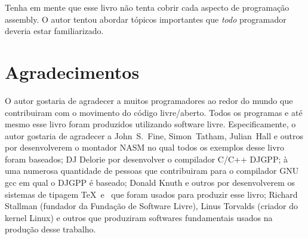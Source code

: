 Tenha em mente que esse livro n\~ao tenta cobrir cada aspecto de programa\c{c}\~ao
assembly. O autor tentou abordar t\'opicos importantes que \emph{todo} programador
deveria estar familiarizado.

\section*{Agradecimentos}

O autor gostaria de agradecer a muitos programadores ao redor do mundo
que contribuiram com o movimento do c\'odigo livre/aberto. Todos os programas
e at\'e mesmo esse livro foram produzidos utilizando software livre. Especificamente,
o autor gostaria de agradecer a John~S.~Fine, Simon~Tatham, Julian~Hall e outros por
desenvolverem o montador NASM no qual todos os exemplos desse livro foram baseados;
DJ Delorie por desenvolver o compilador C/C++ DJGPP; \`a uma numerosa quantidade de
pessoas que contribuiram para o compilador GNU gcc em qual o DJGPP \'e baseado; 
Donald Knuth e outros por desenvolverem os sistemas de tipagem \TeX\ e \LaTeXe\ que
foram usados para produzir esse livro; Richard Stallman (fundador da Funda\c{c}\~ao de
Software Livre), Linus Torvalds (criador do kernel Linux) e outros
que produziram softwares fundamentais usados na produ\c{c}\~ao desse trabalho.

